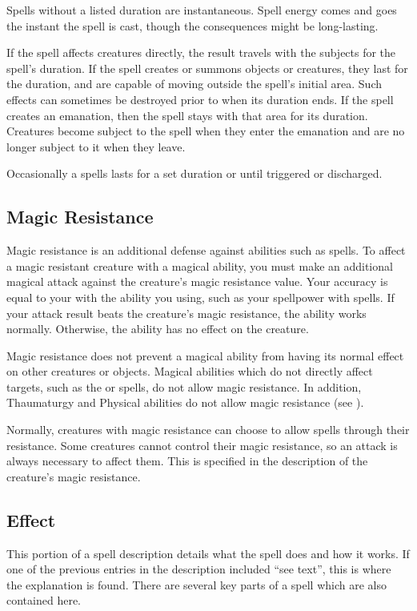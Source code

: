          Spells without a listed duration are instantaneous. Spell energy comes and goes the instant the spell is cast, though the consequences might be long-lasting.

         If the spell affects creatures directly, the result travels with the subjects for the spell's duration. If the spell creates or summons objects or creatures, they last for the duration, and are capable of moving outside the spell's initial area. Such effects can sometimes be destroyed prior to when its duration ends. If the spell creates an emanation, then the spell stays with that area for its duration. Creatures become subject to the spell when they enter the emanation and are no longer subject to it when they leave.

         Occasionally a spells lasts for a set duration or until triggered or discharged.

    \subsection{Magic Resistance}\label{Magic Resistance}
        Magic resistance is an additional defense against  abilities such as spells.
        To affect a magic resistant creature with a magical ability, you must make an additional magical attack against the creature's magic resistance value.
        Your accuracy is equal to your  with the ability you using, such as your spellpower with spells.
        If your attack result beats the creature's magic resistance, the ability works normally.
        Otherwise, the ability has no effect on the creature.

        Magic resistance does not prevent a magical ability from having its normal effect on other creatures or objects.
        Magical abilities which do not directly affect targets, such as the  or  spells, do not allow magic resistance. In addition, Thaumaturgy and Physical abilities do not allow magic resistance (see ).

        Normally, creatures with magic resistance can choose to allow spells through their resistance. Some creatures cannot control their magic resistance, so an attack is always necessary to affect them. This is specified in the description of the creature's magic resistance.

    \subsection{Effect}
        This portion of a spell description details what the spell does and how it works. If one of the previous entries in the description included ``see text'', this is where the explanation is found. There are several key parts of a spell which are also contained here.

